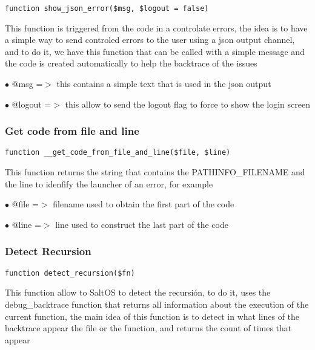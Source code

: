 \documentclass[a4paper]{article}
\begin{document}
\begin{lstlisting}
function show_json_error($msg, $logout = false)
\end{lstlisting}

This function is triggered from the code in a controlate errors, the idea is to have
a simple way to send controled errors to the user using a json output channel, and to
do it, we have this function that can be called with a simple message and the code
is created automatically to help the backtrace of the issues

\begin{compactitem}
\item[\color{myblue}$\bullet$] @msg    =$>$ this contains a simple text that is used in the json output
\item[\color{myblue}$\bullet$] @logout =$>$ this allow to send the logout flag to force to show the login screen
\end{compactitem}

\hypertarget{toc119}{}
\subsubsection{Get code from file and line}

\begin{lstlisting}
function __get_code_from_file_and_line($file, $line)
\end{lstlisting}

This function returns the string that contains the PATHINFO\_FILENAME and the line to idenfify
the launcher of an error, for example

\begin{compactitem}
\item[\color{myblue}$\bullet$] @file =$>$ filename used to obtain the first part of the code
\item[\color{myblue}$\bullet$] @line =$>$ line used to construct the last part of the code
\end{compactitem}

\hypertarget{toc120}{}
\subsubsection{Detect Recursion}

\begin{lstlisting}
function detect_recursion($fn)
\end{lstlisting}

This function allow to SaltOS to detect the recursión, to do it, uses the debug\_backtrace
function that returns all information about the execution of the current function, the
main idea of this function is to detect in what lines of the backtrace appear the file
or the function, and returns the count of times that appear
\end{document}
